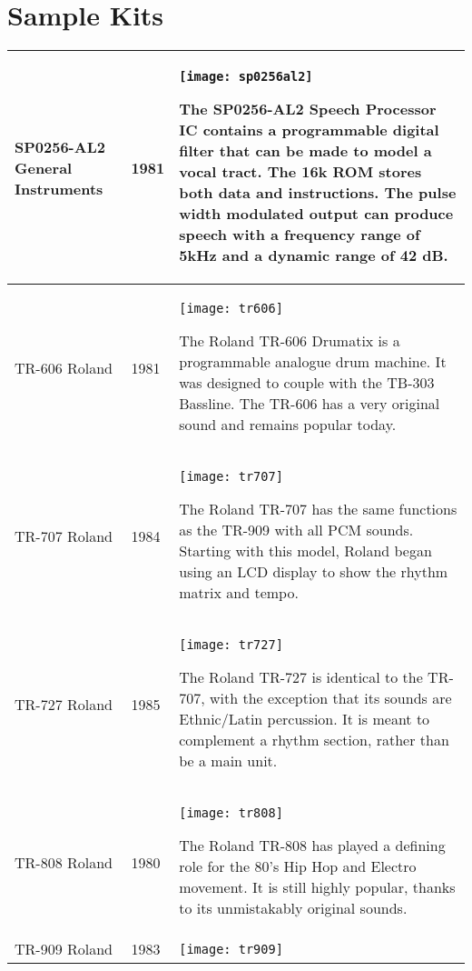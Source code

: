 \chapter{Sample Kits}

\tablelasttail{ \hline }
\begin{xtabular}{p{2.02cm}|l|p{7.8cm}}

\hline
SP0256-AL2 \linebreak
General Instruments 
& 1981 & 
\texttt{[image: sp0256al2]}

The SP0256-AL2 Speech Processor IC contains a programmable digital filter that can be made to model a vocal tract. The 16k ROM stores both data and instructions. The pulse width modulated output can produce speech with a frequency range of 5kHz and a dynamic range of 42 dB. \\
\hline
TR-606 \linebreak Roland & 1981 & 
\texttt{[image: tr606]}

The Roland TR-606 Drumatix is a programmable analogue drum machine. It was designed to couple with the TB-303 Bassline. The TR-606 has a very original sound and remains popular today. \\
\hline
TR-707 \linebreak Roland & 1984 & 
\texttt{[image: tr707]}

The Roland TR-707 has the same functions as the TR-909 with all PCM sounds. Starting with this model, Roland began using an LCD display to show the rhythm matrix and tempo. \\
\hline
TR-727 \linebreak Roland & 1985 & 
\texttt{[image: tr727]}

The Roland TR-727 is identical to the TR-707, with the exception that its sounds are Ethnic/Latin percussion. It is meant to complement a rhythm section, rather than be a main unit. \\
\hline
TR-808 \linebreak Roland & 1980 & 
\texttt{[image: tr808]}

The Roland TR-808 has played a defining role for the 80's Hip Hop and Electro movement. It is still highly popular, thanks to its unmistakably original sounds. \\
\hline
TR-909 \linebreak Roland & 1983 & 
\texttt{[image: tr909]}


\end{xtabular}
